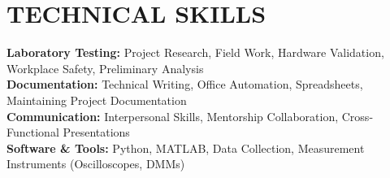 \documentclass[letterpaper,11pt]{article}
\begin{document}
\section{TECHNICAL SKILLS}
 \begin{itemize}[leftmargin=0.15in, label={}]
    \small{\item{
     \textbf{Laboratory Testing:} Project Research, Field Work, Hardware Validation, Workplace Safety, Preliminary Analysis \\
     \textbf{Documentation:} Technical Writing, Office Automation, Spreadsheets, Maintaining Project Documentation \\
     \textbf{Communication:} Interpersonal Skills, Mentorship Collaboration, Cross-Functional Presentations \\
     \textbf{Software \& Tools:} Python, MATLAB, Data Collection, Measurement Instruments (Oscilloscopes, DMMs)
    }}
 \end{itemize}


\end{document}
